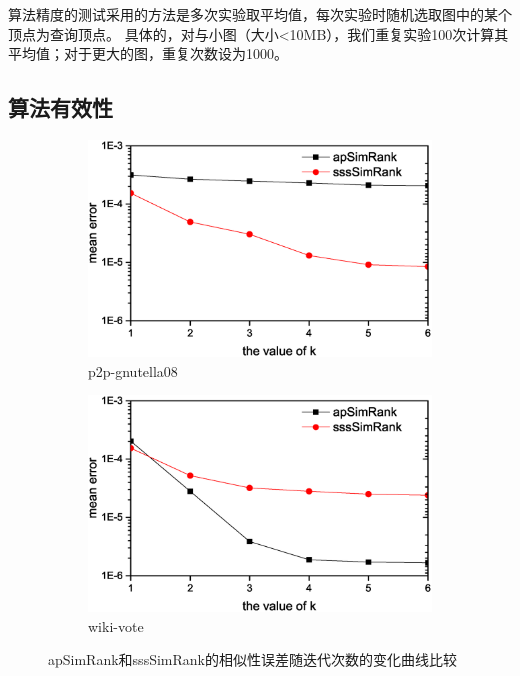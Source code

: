 \documentclass[master]{njuthesis}
\begin{document}
算法精度的测试采用的方法是多次实验取平均值，每次实验时随机选取图中的某个顶点为查询顶点。
具体的，对与小图（大小<10MB），我们重复实验100次计算其平均值；对于更大的图，重复次数设为1000。
\subsection{算法有效性}
\begin{figure}[t]
\centering
\begin{subfigure}[b]{0.48\textwidth}
	\center
	\includegraphics[width=1\textwidth]{figure/accuracy1.eps}
	\caption{p2p-gnutella08}
	\label{fig:ch1:effec:one}
\end{subfigure}
\begin{subfigure}[b]{0.48\textwidth}
	\centering
	\includegraphics[width=1\textwidth]{figure/accuracy2.eps}
	\caption{wiki-vote}
	\label{fig:ch1:effec:two}
\end{subfigure}
\label{fig:ch1:effec}
\caption{apSimRank和sssSimRank的相似性误差随迭代次数的变化曲线比较}
\end{figure}
\end{document}
